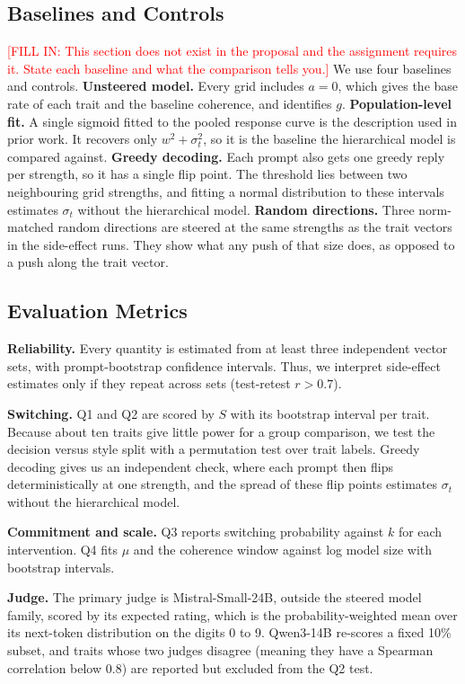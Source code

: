 \documentclass[11pt]{article}
\newcommand{\fillin}[1]{\textcolor{red}{[FILL IN: #1]}}
\newcommand{\upd}[1]{{\color{updgreen}#1}}
\begin{document}
\subsection{Baselines and Controls}
\fillin{This section does not exist in the proposal and the assignment requires it.
State each baseline and what the comparison tells you.}
\upd{We use four baselines and controls.
\textbf{Unsteered model.} Every grid includes $a=0$, which gives the base rate of
each trait and the baseline coherence, and identifies $g$.
\textbf{Population-level fit.} A single sigmoid fitted to the pooled response
curve is the description used in prior work. It recovers only $w^2 + \sigma_t^2$,
so it is the baseline the hierarchical model is compared against.
\textbf{Greedy decoding.} Each prompt also gets one greedy reply per strength, so
it has a single flip point. The threshold lies between two neighbouring grid
strengths, and fitting a normal distribution to these intervals estimates
$\sigma_t$ without the hierarchical model.
\textbf{Random directions.} Three norm-matched random directions are steered at
the same strengths as the trait vectors in the side-effect runs. They show what
any push of that size does, as opposed to a push along the trait vector.}

\subsection{Evaluation Metrics}
\textbf{Reliability.} Every quantity \upd{is} estimated from at least three independent
vector sets, with prompt-bootstrap confidence intervals. Thus, we interpret
side-effect estimates only if they repeat across sets (test-retest $r > 0.7$).

\textbf{Switching.} Q1 and Q2 are scored by $S$ with its bootstrap interval per trait.
Because about ten traits give little power for a group comparison, we \upd{test} the
decision versus style split with a permutation test over trait labels. Greedy decoding
\upd{gives} us an independent check, where each prompt then flips deterministically at
one strength, and the spread of these flip points estimates $\sigma_t$ without the
hierarchical model.

\textbf{Commitment and scale.} Q3 reports switching probability against $k$ for each
intervention. Q4 fits $\mu$ and the coherence window against log model size with
bootstrap intervals.

\textbf{Judge.} The primary judge \upd{is} Mistral-Small-24B, outside the steered model
family, scored by its expected rating, which is the probability-weighted mean over its
next-token distribution on the digits 0 to 9. Qwen3-14B \upd{re-scores} a fixed 10\%
subset, and traits whose two judges disagree (meaning they have a Spearman correlation
below 0.8) \upd{are} reported but excluded from the Q2 test.
\end{document}
